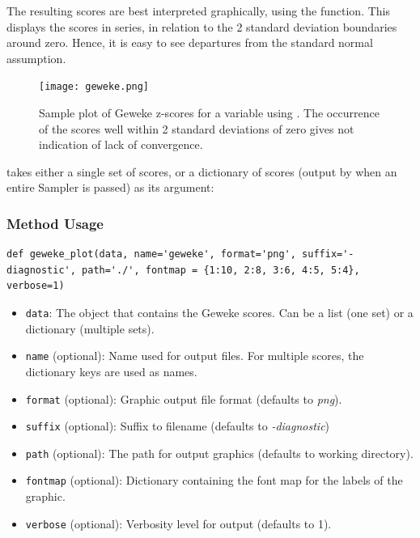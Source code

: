 The resulting scores are best interpreted graphically, using the  function. This displays the scores in series, in relation to the 2 standard deviation boundaries around zero. Hence, it is easy to see departures from the standard normal assumption.

\begin{figure}[ht]
\begin{center}
\texttt{[image: geweke.png]}
\caption{Sample plot of Geweke z-scores for a variable using . The occurrence of the scores well within 2 standard deviations of zero gives not indication of lack of convergence.}
\label{fig:geweke}
\end{center}
\end{figure}

 takes either a single set of scores, or a dictionary of scores (output by  when an entire Sampler is passed) as its argument:

\subsubsection*{Method Usage}
\begin{verbatim}
def geweke_plot(data, name='geweke', format='png', suffix='-diagnostic', path='./', fontmap = {1:10, 2:8, 3:6, 4:5, 5:4}, verbose=1)
\end{verbatim}
\begin{itemize}
	
\item \verb=data=: The object that contains the Geweke scores. Can be a list (one set) or a dictionary (multiple sets).

\item \verb=name= (optional): Name used for output files. For multiple scores, the dictionary keys are used as names.

\item \verb=format= (optional): Graphic output file format (defaults to \emph{png}).

\item \verb=suffix= (optional): Suffix to filename (defaults to \emph{-diagnostic})

\item \verb=path= (optional): The path for output graphics (defaults to working directory).

\item \verb=fontmap= (optional): Dictionary containing the font map for the labels of the graphic.

\item \verb=verbose= (optional): Verbosity level for output (defaults to 1).
\end{itemize}

